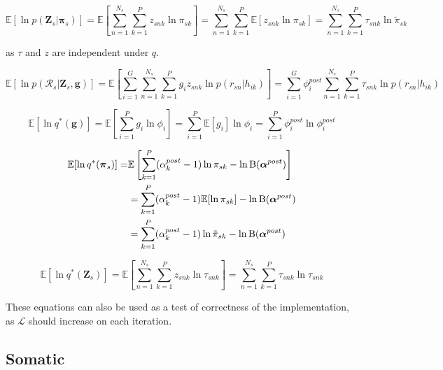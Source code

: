 \documentclass{article}
\begin{document}
\begin{equation}
\mathbb{E}[\ln p(\boldsymbol{Z}_s | \boldsymbol{\pi}_s)] = \mathbb{E}\left[\sum_{n = 1}^{N_s} \sum_{k = 1}^P z_{snk} \ln \pi_{sk} \right] 
= \sum_{n = 1}^{N_s} \sum_{k = 1}^P \mathbb{E}[z_{snk} \ln \pi_{sk}]
= \sum_{n = 1}^{N_s} \sum_{k = 1}^P \tau_{snk} \ln \tilde{\pi}_{sk}
\end{equation}

as $\tau$ and $z$ are independent under $q$.

\begin{equation}
\mathbb{E}[\ln p(\mathcal{R}_s | \boldsymbol{Z}_s, \boldsymbol{g})] = \mathbb{E}\left[ \sum_{i = 1}^G \sum_{n = 1}^{N_s} \sum_{k = 1}^P g_i z_{snk} \ln p(r_{sn} | h_{ik}) \right] = \sum_{i = 1}^G \phi_i^{post} \sum_{n = 1}^{N_s} \sum_{k = 1}^P \tau_{snk} \ln p(r_{sn} | h_{ik})
\end{equation}

\begin{equation}
\mathbb{E}[\ln q^*(\boldsymbol{g})] = \mathbb{E}\left[\sum_{i = 1}^P g_i \ln \phi_i\right] = \sum_{i = 1}^P \mathbb{E}[g_i] \ln \phi_i = \sum_{i = 1}^P \phi_i^{post} \ln \phi_i^{post}
\end{equation}

\begin{align}
\mathbb{E}[\ln q^*(\boldsymbol{\pi}_s)] =& \mathbb{E}\left[\sum_{k = 1}^P (\alpha_k^{post} - 1) \ln \pi_{sk} - \ln \text{B}(\boldsymbol{\alpha}^{post})\right] \notag \\ 
&= \sum_{k = 1}^P (\alpha_k^{post} - 1) \mathbb{E} [\ln \pi_{sk}] - \ln \text{B}(\boldsymbol{\alpha}^{post}) \notag \\
 &= \sum_{k = 1}^P (\alpha_k^{post} - 1) \ln \tilde{\pi}_{sk} - \ln \text{B}(\boldsymbol{\alpha}^{post})
\end{align}

\begin{equation}
\mathbb{E}[\ln q^*(\boldsymbol{Z}_s)] = \mathbb{E}\left[\sum_{n = 1}^{N_s} \sum_{k = 1}^P z_{snk} \ln \tau_{snk} \right] = \sum_{n = 1}^{N_s} \sum_{k = 1}^P \tau_{snk} \ln \tau_{snk}
\end{equation}

These equations can also be used as a test of correctness of the implementation, as $\mathcal{L}$ should increase on each iteration.

\subsection{Somatic}
\end{document}
